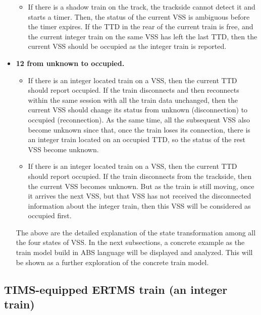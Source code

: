 \documentclass[article,dr=phil,type=drfinal,colorback,accentcolor=tud9c]{tudthesis}
\begin{document}
\begin{itemize}
\begin{itemize}
	\item 
	
	If there is a shadow train on the track, the trackside cannot detect it and starts a timer. Then, the status of the current VSS is ambiguous before the timer expires. If the TTD in the rear of the current train is free, and the current integer train on the same VSS has left the last TTD, then the current VSS should be occupied as the integer train is reported.
	
    \end{itemize}    	

  	\item \textbf{12 from unknown to occupied.}

  	\begin{itemize}
	
	\item 
	
	If there is an integer located train on a VSS, then the current TTD should report occupied. If the train disconnects and then reconnects within the same session with all the train data unchanged, then the current VSS should change its status from unknown (disconnection) to occupied (reconnection). As the same time, all the subsequent VSS also become unknown since that, once the train loses its connection, there is an integer train located on an occupied TTD, so the status of the rest VSS become unknown.
	
	\item 
	
	If there is an integer located train on a VSS, then the current TTD should report occupied. If the train disconnects from the trackside, then the current VSS becomes unknown. But as the train is still moving, once it arrives the next VSS, but that VSS has not received the disconnected information about the integer train, then this VSS will be considered as occupied first.
	
    \end{itemize}  

  The above are the detailed explanation of the state transformation among all the four states of VSS. In the next subsections, a concrete example as the train model build in ABS language will be displayed and analyzed. This will be shown as a further exploration of the concrete train model.
  
  \end{itemize}
  
  \subsection{TIMS-equipped ERTMS train (an integer train)}
  
\end{document}
